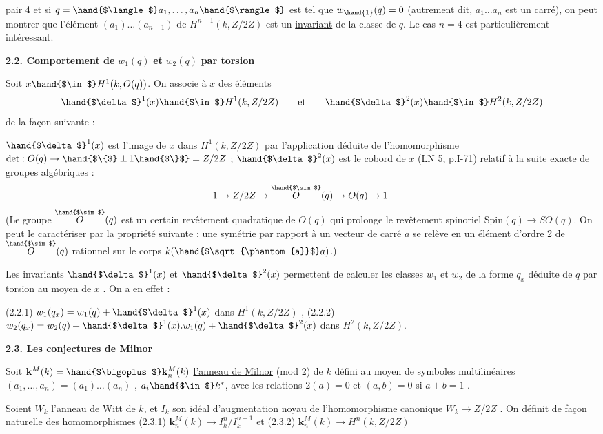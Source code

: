 
pair \hand{$\geq$} 4 et si $q = \hand{$\langle$} a_1,\dots,a_n \hand{$\rangle$}$ est tel que $w_{\hand{1}}(q) = 0$ (autrement dit,
$a_1\dots a_n$ est un carré), on peut montrer que l'élément $(a_1)\dots(a_{n-1})$ de
$H^{n-1}(k, Z/2Z)$ est un \uline{invariant} de la classe de $q$. Le cas $n = 4$ est
particulièrement intéressant.

\textbf{2.2. Comportement de} $w_1(q)$ \textbf{et} $w_2(q)$ \textbf{par torsion}

Soit $x \hand{$\in$} H^1(k, O(q))$. On associe à $x$ des éléments
\[ \hand{$\delta$}^1(x) \hand{$\in$} H^1(k,Z/2Z) \qquad\text{et}\qquad \hand{$\delta$}^2(x) \hand{$\in$} H^2(k,Z/2Z) \]
de la façon suivante :

$\hand{$\delta$}^1(x)$ est l'image de $x$ dans $H^1(k,Z/2Z)$ par l'application déduite
de l'homomorphisme $\det : O(q) \to \hand{$\{$} \pm 1 \hand{$\}$} = Z/2Z$ ;
$\hand{$\delta$}^2(x)$ est le cobord de $x$ (LN 5, p.I-71) relatif à la suite exacte
de groupes algébriques :
\[ 1 \to Z/2Z \to \overset{\hand{$\sim$}}{O}(q) \to O(q) \to 1 . \]
(Le groupe $\overset{\hand{$\sim$}}{O}(q)$ est un certain revêtement quadratique de $O(q)$ qui
prolonge le revêtement spinoriel $\mathrm{Spin}(q) \to SO(q)$. On peut le caractériser
par la propriété suivante : une symétrie par rapport à un vecteur de
carré $a$ se relève en un élément d'ordre 2 de $\overset{\hand{$\sim$}}{O}(q)$ rationnel sur
le corps $k(\hand{$\sqrt{\phantom{a}}$}a)$.)

Les invariants $\hand{$\delta$}^1(x)$ et $\hand{$\delta$}^2(x)$ permettent de calculer les classes
$w_1$ et $w_2$ de la forme $q_x$ déduite de $q$ par torsion au moyen de $x$ .
On a en effet :

(2.2.1) \quad $w_1(q_x) = w_1(q) + \hand{$\delta$}^1(x)$ \qquad dans $H^1(k,Z/2Z)$ ,
(2.2.2) \quad $w_2(q_x) = w_2(q) + \hand{$\delta$}^1(x).w_1(q) + \hand{$\delta$}^2(x)$ \quad dans $H^2(k, Z/2Z)$.

\textbf{2.3. Les conjectures de Milnor}

Soit $\mathbf{k}^M(k) = \hand{$\bigoplus$} \mathbf{k}^M_n(k)$ \uline{l'anneau de Milnor} (mod 2) de $k$\hand{,} défini au
moyen de symboles multilinéaires $(a_1,\dots,a_n) = (a_1)\dots(a_n)$ , $a_i \hand{$\in$} k^*$, avec
les relations $2(a) = 0$ et $(a,b) = 0$ si $a+b = 1$ .

Soient $W_k$ l'anneau de Witt de $k$, et $I_k$ son idéal d'augmentation\hand{\unsure{,}} noyau de
l'homomorphisme canonique $W_k \to Z/2Z$ .
On définit de façon naturelle des homomorphismes
(2.3.1) \quad $\mathbf{k}^M_n(k) \to I^n_k/I^{n+1}_k$
et
(2.3.2) \quad $\mathbf{k}^M_n(k) \to H^n(k,Z/2Z)$ 

